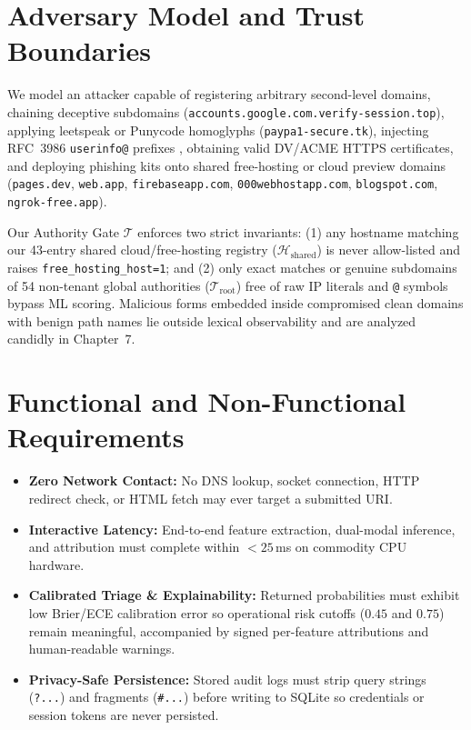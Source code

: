 \documentclass[12pt,a4paper]{report}
\begin{document}
\section{Adversary Model and Trust Boundaries}
We model an attacker capable of registering arbitrary second-level domains, chaining deceptive subdomains (\texttt{accounts.google.com.\allowbreak verify-session.top}), applying leetspeak or Punycode homoglyphs (\texttt{paypa1-secure.tk}), injecting RFC~3986 \texttt{userinfo@} prefixes \cite{rfc3986}, obtaining valid DV/ACME HTTPS certificates, and deploying phishing kits onto shared free-hosting or cloud preview domains (\texttt{pages.dev}, \texttt{web.app}, \texttt{firebaseapp.com}, \texttt{000webhostapp.com}, \texttt{blogspot.com}, \texttt{ngrok-free.app}).

Our Authority Gate $\mathcal{T}$ enforces two strict invariants: (1) any hostname matching our 43-entry shared cloud/free-hosting registry ($\mathcal{H}_{\text{shared}}$) is never allow-listed and raises \texttt{free\_hosting\_host=1}; and (2) only exact matches or genuine subdomains of 54 non-tenant global authorities ($\mathcal{T}_{\text{root}}$) free of raw IP literals and \texttt{@} symbols bypass ML scoring. Malicious forms embedded inside compromised clean domains with benign path names lie outside lexical observability and are analyzed candidly in Chapter~7.

\section{Functional and Non-Functional Requirements}
\begin{itemize}
\item \textbf{Zero Network Contact:} No DNS lookup, socket connection, HTTP redirect check, or HTML fetch may ever target a submitted URI.
\item \textbf{Interactive Latency:} End-to-end feature extraction, dual-modal inference, and attribution must complete within $<25$\,ms on commodity CPU hardware.
\item \textbf{Calibrated Triage \& Explainability:} Returned probabilities must exhibit low Brier/ECE calibration error so operational risk cutoffs ($0.45$ and $0.75$) remain meaningful, accompanied by signed per-feature attributions and human-readable warnings.
\item \textbf{Privacy-Safe Persistence:} Stored audit logs must strip query strings (\texttt{?...}) and fragments (\texttt{\#...}) before writing to SQLite so credentials or session tokens are never persisted.
\end{itemize}
\end{document}

